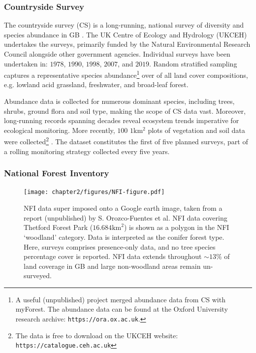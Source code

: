 \subsubsection{Countryside Survey}

The countryside survey (CS) is a long-running, national survey of diversity and species abundance in GB \cite{wood2017long}.
The UK Centre of Ecology and Hydrology (UKCEH) undertakes the surveys, primarily funded by the Natural Environmental Research Council alongside other government agencies.
Individual surveys have been undertaken in: $1978$, $1990$, $1998$, $2007$, and $2019$. 
Random stratified sampling captures a representative species abundance\footnote{
A useful (unpublished) project merged abundance data from CS with myForest. The abundance data can be found at the Oxford University research archive: \nolinkurl{https://ora.ox.ac.uk}.} 
over of all land cover compositions, e.g. lowland acid grassland, freshwater, and broad-leaf forest.

Abundance data is collected for numerous dominant species, including trees, shrubs, ground flora and soil type, 
making the scope of CS data vast. Moreover, long-running records spanning decades reveal ecosystem trends imperative for ecological monitoring.
More recently, $100$ $1\mathrm{km^2}$ plots of vegetation and soil data were collected\footnote{
The data is free to download on the UKCEH website: \nolinkurl{https://catalogue.ceh.ac.uk}} \cite{10.5285/fd6ae272-aeb5-4573-8e8a-7ccfae64f506}.
The dataset constitutes the first of five planned surveys, part of a rolling monitoring strategy collected every five years.

\subsubsection{National Forest Inventory}

\begin{figure}
    \centering
    \texttt{[image: chapter2/figures/NFI-figure.pdf]}
    \caption{NFI data super imposed onto a Google earth image, taken from a report (unpublished) by S. Orozco-Fuentes et al.
             NFI data covering Thetford Forest Park ($16.684 \mathrm{km}^2$) is shown as a polygon in the NFI `woodland' category.
             Data is interpreted as the conifer forest type. Here, surveys comprises presence-only data, and no tree species percentage cover
             is reported. NFI data extends throughout $\sim 13\%$ of land coverage in GB and large non-woodland areas remain un-surveyed.}
    \label{fig:NFI-data}
\end{figure}

